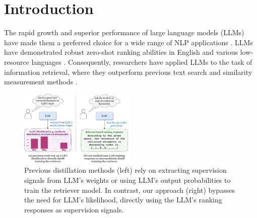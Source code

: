 \section{Introduction}

The rapid growth and superior performance of large language models (LLMs) \cite{ouyang2022training, openai2023gpt4, wang2024survey} have made them a preferred choice for a wide range of NLP applications \cite{xi2023rise, wang2024survey, wu2023bloomberggpt, zhang2023extractive, zhang2023summit}. 
LLMs have demonstrated robust zero-shot ranking abilities in English and various low-resource languages \cite{adeyemi2023zero, sun2023chatgpt}. Consequently, researchers have applied LLMs to the task of information retrieval, where they outperform previous text search and similarity measurement methods \cite{ma2023fine, xu2024bmretriever}.
\begin{figure}[t]
    \centering
    \includegraphics[width=0.5\textwidth]{latex/pic/fig1.pdf} %
    \caption{Previous distillation methods (left) rely on extracting supervision signals from LLM's weights or using LLM's output probabilities to train the retriever model. 
    In contrast, our approach (right) bypasses the need for LLM's likelihood, directly using the LLM's ranking responses as supervision signals.}
    \label{fig:01}
    \vspace{-5mm}  %
\end{figure}


